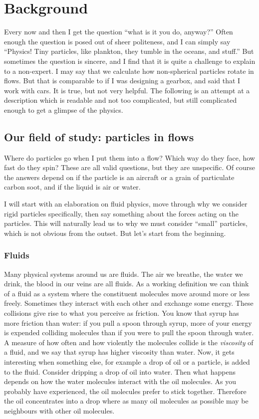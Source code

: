 \documentclass[thesis.tex]{subfiles}
\begin{document}
\chapter{Background}

 Every now and then I get the question ``what is it you do, anyway?'' Often enough the question is posed out of sheer politeness, and I can simply say ``Physics! Tiny particles, like plankton, they tumble in the oceans, and stuff.'' But sometimes the question is sincere, and I find that it is quite a challenge to explain to a non-expert. I may say that we calculate how non-spherical particles rotate in flows. But that is comparable to if I was designing a gearbox, and said that I work with cars. It is true, but not very helpful. The following is an attempt at a description which is readable and not too complicated, but still complicated enough to get a glimpse of the physics.


\section{Our field of study: particles in flows}\label{sec:context}

Where do particles go when I put them into a flow? Which way do they face, how fast do they spin? These are all valid questions, but they are unspecific. Of course the answers depend on if the particle is an aircraft or a grain of particulate carbon soot, and if the liquid is air or water. 

I will start with an elaboration on fluid physics, move through why we consider rigid particles specifically, then say something about the forces acting on the particles. This will naturally lead us to why we must consider ``small'' particles, which is not obvious from the outset. But let's start from the beginning.

\subsection*{Fluids}

Many physical systems around us are fluids. The air we breathe, the water we drink, the blood in our veins are all fluids. As a working definition we can think of a fluid as a system where the constituent molecules move around more or less freely. Sometimes they interact with each other and exchange some energy. These collisions give rise to what you perceive as friction. You know that syrup has more friction than water: if you pull a spoon through syrup, more of your energy is expended colliding molecules than if you were to pull the spoon through water. A measure of how often and how violently the molecules collide is the \emph{viscosity} of a fluid, and we say that syrup has higher viscosity than water. Now, it gets interesting when something else, for example a drop of oil or a particle, is added to the fluid. Consider dripping a drop of oil into water. Then what happens depends on how the water molecules interact with the oil molecules. As you probably have experienced, the oil molecules prefer to stick together. Therefore the oil concentrates into a drop where as many oil molecules as possible may be neighbours with other oil molecules.
\end{document}
